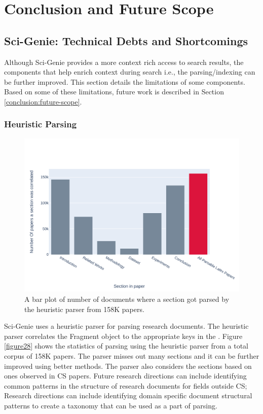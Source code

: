 \chapter{Conclusion and Future Scope}
\label{conclusion}

\section{Sci-Genie: Technical Debts and Shortcomings}
Although Sci-Genie provides a more context rich access to search results, the components that help enrich context during search i.e., the parsing/indexing can be further improved. This section details the limitations of some components. Based on some of these limitations, future work is described in Section \ref{conclusion:future-scope}.

\subsection{Heuristic Parsing}
\begin{figure}[h]
    \centering
    \includegraphics[width=\maxwidth{\textwidth}]{src/images/parsing-stats.pdf}
    \caption{ A bar plot of number of documents where a section got parsed by the heuristic parser from 158K papers. }
    \label{figure\arabic{figurecounter}}
\end{figure}
Sci-Genie uses a heuristic parser for parsing research documents. The heuristic parser correlates the Fragment object to the appropriate keys in the . Figure \ref{figure28} shows the statistics of parsing using the heuristic parser from a total corpus of 158K papers. The parser misses out many sections and it can be further improved using better methods. The parser also considers the sections based on ones observed in CS papers. Future research directions can include identifying common patterns in the structure of research documents for fields outside CS; Research directions can include identifying domain specific document structural patterns to create a taxonomy that can be used as a part of parsing.



